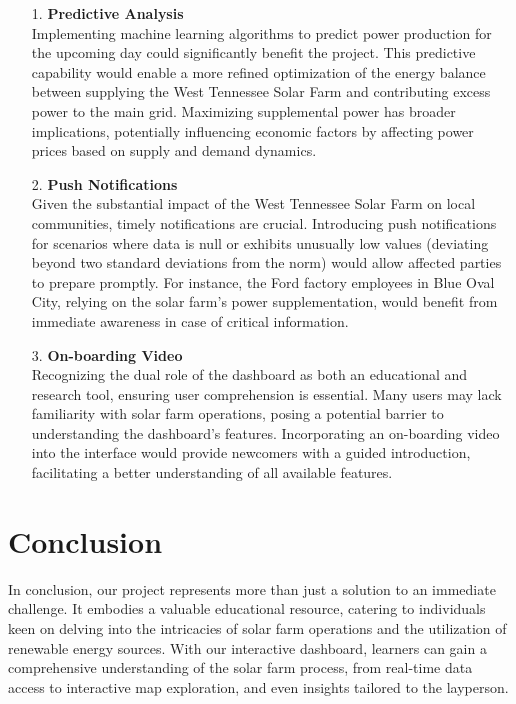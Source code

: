 \documentclass{sigchi}
\begin{document}
\begin{itemize}
    \item[1.] \textbf{Predictive Analysis}\\
    Implementing machine learning algorithms to predict power production for the upcoming day could significantly benefit the project. This predictive capability would enable a more refined optimization of the energy balance between supplying the West Tennessee Solar Farm and contributing excess power to the main grid. Maximizing supplemental power has broader implications, potentially influencing economic factors by affecting power prices based on supply and demand dynamics.

    \item[2.] \textbf{Push Notifications}\\
    Given the substantial impact of the West Tennessee Solar Farm on local communities, timely notifications are crucial. Introducing push notifications for scenarios where data is null or exhibits unusually low values (deviating beyond two standard deviations from the norm) would allow affected parties to prepare promptly. For instance, the Ford factory employees in Blue Oval City, relying on the solar farm's power supplementation, would benefit from immediate awareness in case of critical information.

    \item[3.] \textbf{On-boarding Video}\\
    Recognizing the dual role of the dashboard as both an educational and research tool, ensuring user comprehension is essential. Many users may lack familiarity with solar farm operations, posing a potential barrier to understanding the dashboard's features. Incorporating an on-boarding video into the interface would provide newcomers with a guided introduction, facilitating a better understanding of all available features.
\end{itemize}

\section{Conclusion}

In conclusion, our project represents more than just a solution to an immediate challenge. It embodies a valuable educational resource, catering to individuals keen on delving into the intricacies of solar farm operations and the utilization of renewable energy sources. With our interactive dashboard, learners can gain a comprehensive understanding of the solar farm process, from real-time data access to interactive map exploration, and even insights tailored to the layperson. 
\end{document}
